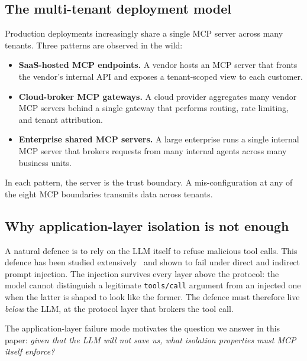 \documentclass[sigconf, anonymous, natbib=false]{acmart}
\begin{document}
\subsection{The multi-tenant deployment model}

Production deployments increasingly share a single MCP
server across many tenants. Three patterns are observed in
the wild:

\begin{itemize}
  \item \textbf{SaaS-hosted MCP endpoints.} A vendor hosts
        an MCP server that fronts the vendor's internal API
        and exposes a tenant-scoped view to each customer.
  \item \textbf{Cloud-broker MCP gateways.} A cloud
        provider aggregates many vendor MCP servers behind a
        single gateway that performs routing, rate limiting,
        and tenant attribution.
  \item \textbf{Enterprise shared MCP servers.} A large
        enterprise runs a single internal MCP server that
        brokers requests from many internal agents across
        many business units.
\end{itemize}

In each pattern, the server is the trust boundary. A
mis-configuration at any of the eight MCP boundaries
transmits data across tenants.

\subsection{Why application-layer isolation is not enough}

A natural defence is to rely on the LLM itself to refuse
malicious tool calls. This defence has been studied
extensively~\cite{greshake2023youve,perez2022ignore,
chowdhury2024} and shown to fail under direct and indirect
prompt injection. The injection survives every layer above
the protocol: the model cannot distinguish a legitimate
\texttt{tools/call} argument from an injected one when the
latter is shaped to look like the former. The defence must
therefore live \emph{below} the LLM, at the protocol layer
that brokers the tool call.

The application-layer failure mode motivates the question we
answer in this paper: \emph{given that the LLM will not
save us, what isolation properties must MCP itself
enforce?}

\end{document}

